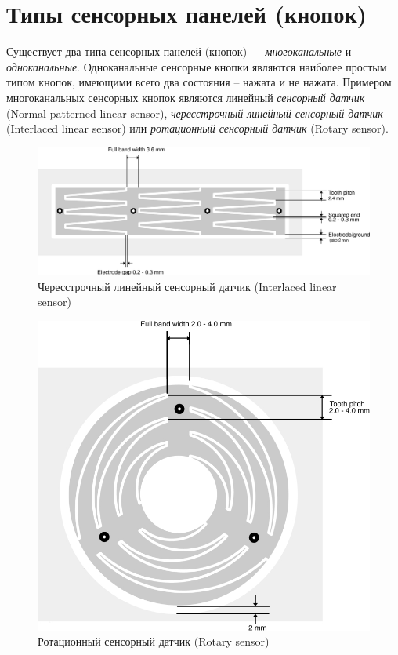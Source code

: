 \section{Типы сенсорных панелей (кнопок)}
Существует два типа сенсорных панелей (кнопок) --- \textit{многоканальные} и \textit{одноканальные}. Одноканальные сенсорные кнопки являются наиболее простым типом кнопок, имеющими всего два состояния -- нажата и не нажата. Примером многоканальных сенсорных кнопок являются линейный \textit{сенсорный датчик} (Normal patterned linear sensor), \textit{чересстрочный линейный сенсорный датчик} (Interlaced linear sensor) или \textit{ротационный сенсорный датчик} (Rotary sensor).
\begin{figure}[H]
\begin{center}
\includegraphics[scale=0.25]{Image/59.jpg} 
\end{center}
\caption{Чересстрочный линейный сенсорный датчик (Interlaced linear sensor)}
\end{figure}

\begin{figure}[H]
\begin{center}
\includegraphics[scale=0.25]{Image/60.jpg} 
\end{center}
\caption{Ротационный сенсорный датчик (Rotary sensor)}
\end{figure}

